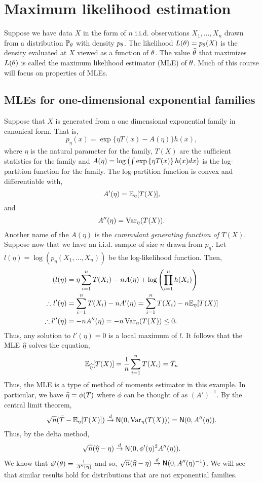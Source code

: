 \section{Maximum likelihood estimation}
Suppose we have data $X$ in the form of $n$ i.i.d. observations $X_1,\ldots,X_n$ drawn from a distribution ${\mathbb{P}}_{\theta}$ with density $p_{\theta}$. The likelihood $L({\theta})= p_{\theta}(X)$ is the density evaluated at $X$ viewed as a function of ${\theta}$. The value $\widehat{{\theta}}$ that maximizes $L({\theta})$ is called the maximum likelihood estimator (MLE) of ${\theta}$. Much of this course will focus on properties of MLEs.
\subsection{MLEs for one-dimensional exponential families}
Suppose that $X$ is generated from a one dimensional exponential family in canonical form. That is, 
\[p_\eta(x) = \exp\{\eta T(x) - A(\eta)\}h(x), \]
where $\eta$ is the natural parameter for the family, $T(X)$ are the sufficient statistics for the family and $A(\eta) = \log\left(\int \exp\left\{\eta T(x)\right\}h(x)dx\right)$ is the log-partition function for the family. The log-partition function is convex and differentiable  with,
\[A'(\eta) = {\mathbb{E}}_\eta[T(X)],\]
and 
\[A''(\eta) = \operatorname{Var}_\eta(T(X)).\]
Another name of the $A(\eta)$ is the \emph{cummulant generating function of $T(X)$}. Suppose now that we have an i.i.d. sample of size $n$ drawn from $p_\eta$. Let $l(\eta) = \log(p_\eta(X_1,\ldots,X_n))$ be the log-likelihood function. Then,
\begin{align*}(
    l(\eta)&= \eta \sum_{i=1}^n T(X_i)-nA(\eta)+\log\left(\prod_{i=1}^n h(X_i)\right)\\
    \therefore l'(\eta) &= \sum_{i=1}^n T(X_i)-nA'(\eta) = \sum_{i=1}^n T(X_i)-n{\mathbb{E}}_\eta[T(X)]\\
    \therefore l''(\eta) &= -nA''(\eta) = -n\operatorname{Var}_\eta(T(X)) \le 0.
\end{align*}
Thus, any solution to $l'(\eta)=0$ is a local maximum of $l$. It follows that the MLE $\widehat{\eta}$ solves the equation,
\[{\mathbb{E}}_{\widehat{\eta}}[T(X)] = \frac{1}{n}\sum_{i=1}^n T(X_i) = \bar{T}_n  \]
Thus, the MLE is a type of method of moments estimator in this example. In particular, we have $\widehat{\eta} = \phi(\bar{T})$ where $\phi$ can be thought of as $(A')^{-1}$. By the central limit theorem,
\[\sqrt{n}(\bar{T}-{\mathbb{E}}_\eta[T(X)]) \stackrel{d}{\to} \mathsf{N}(0,\operatorname{Var}_\eta(T(X))) = \mathsf{N}(0,A''(\eta)). \]
Thus, by the delta method,
\[\sqrt{n}(\widehat{\eta}-\eta) \stackrel{d}{\to} \mathsf{N}(0, \phi'(\eta)^2A''(\eta)). \]
We know that $\phi'({\theta}) = \frac{1}{A''(\eta)}$ and so, $\sqrt{n}(\widehat{\eta}-\eta) \stackrel{d}{\to} \mathsf{N}(0, A''(\eta)^{-1})$. We will see that similar results hold for distributions that are not exponential families.
